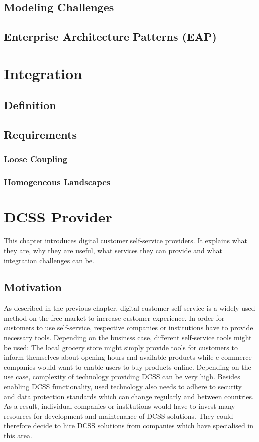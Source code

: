 \documentclass[
     12pt,         %
     a4paper,      %
     BCOR=10mm,version=first,     %
     DIV=14,version=first,        %
     ]{scrreprt}
\begin{document}
\subsection{Modeling Challenges}

\subsection{Enterprise Architecture Patterns (EAP)}

\section{Integration}

\subsection{Definition}

\subsection{Requirements}

\subsubsection{Loose Coupling}

\subsubsection{Homogeneous Landscapes}

\section{DCSS Provider}

This chapter introduces digital customer self-service providers. It explains what they are, why they are useful, what services they can provide and what integration challenges can be.

\subsection{Motivation}

As described in the previous chapter, digital customer self-service is a widely used method on the free market to increase customer experience. In order for customers to use self-service, respective companies or institutions have to provide necessary tools. Depending on the business case, different self-service tools might be used: The local grocery store might simply provide tools for customers to inform themselves about opening hours and available products while e-commerce companies would want to enable users to buy products online. Depending on the use case, complexity of technology providing DCSS can be very high. Besides enabling DCSS functionality, used technology also needs to adhere to security and data protection standards which can change regularly and between countries. As a result, individual companies or institutions would have to invest many resources for development and maintenance of DCSS solutions. They could therefore decide to hire DCSS solutions from companies which have specialised in this area.
\end{document}
